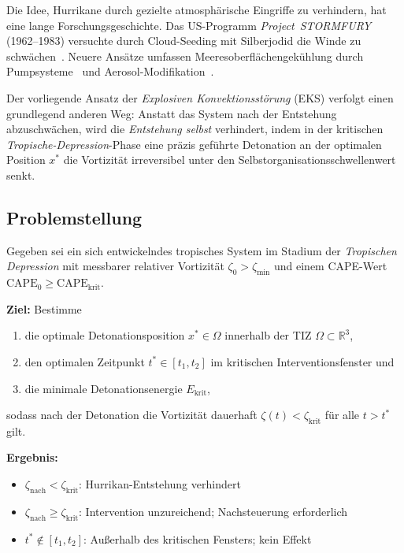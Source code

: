 ﻿\documentclass[a4paper,12pt]{article}
\theoremstyle{definition}
\begin{document}
Die Idee, Hurrikane durch gezielte atmosph\"{a}rische Eingriffe zu verhindern, hat eine
lange Forschungsgeschichte.
Das US-Programm \emph{Project~STORMFURY} (1962--1983) versuchte durch Cloud-Seeding
mit Silberjodid die Winde zu schw\"{a}chen~\cite{willoughby1985}.
Neuere Ans\"{a}tze umfassen Meeresoberfl\"{a}chengek\"{u}hlung durch Pumpsysteme~\cite{salter2008}
und Aerosol-Modifikation~\cite{rosenfeld2007}.

Der vorliegende Ansatz der \emph{Explosiven Konvektionsst\"{o}rung} (EKS) verfolgt
einen grundlegend anderen Weg:
Anstatt das System nach der Entstehung abzuschw\"{a}chen, wird die
\emph{Entstehung selbst} verhindert, indem in der kritischen
\emph{Tropische-Depression}-Phase eine pr\"{a}zis gef\"{u}hrte Detonation an der
optimalen Position $x^{*}$ die Vortizit\"{a}t irreversibel unter den
Selbstorganisationsschwellenwert senkt.

\subsection{Problemstellung}

Gegeben sei ein sich entwickelndes tropisches System im Stadium der
\emph{Tropischen Depression} mit messbarer relativer Vortizit\"{a}t
$\zeta_{0}>\zeta_{\min}$ und einem CAPE-Wert
$\mathrm{CAPE}_{0}\geq\mathrm{CAPE}_{\mathrm{krit}}$.

\textbf{Ziel:} Bestimme
\begin{enumerate}
    \item die optimale Detonationsposition $x^{*}\in\Omega$ innerhalb der TIZ
          $\Omega\subset\mathbb{R}^{3}$,
    \item den optimalen Zeitpunkt $t^{*}\in[t_{1},t_{2}]$ im kritischen
          Interventionsfenster und
    \item die minimale Detonationsenergie $E_{\mathrm{krit}}$,
\end{enumerate}
sodass nach der Detonation die Vortizit\"{a}t dauerhaft
$\zeta(t)<\zeta_{\mathrm{krit}}$ f\"{u}r alle $t>t^{*}$ gilt.

\textbf{Ergebnis:}
\begin{itemize}
    \item $\zeta_{\mathrm{nach}}<\zeta_{\mathrm{krit}}$: Hurrikan-Entstehung
          verhindert \checkmark
    \item $\zeta_{\mathrm{nach}}\geq\zeta_{\mathrm{krit}}$: Intervention
          unzureichend; Nachsteuerung erforderlich
    \item $t^{*}\notin[t_{1},t_{2}]$: Au\ss{}erhalb des kritischen Fensters;
          kein Effekt
\end{itemize}
\end{document}
